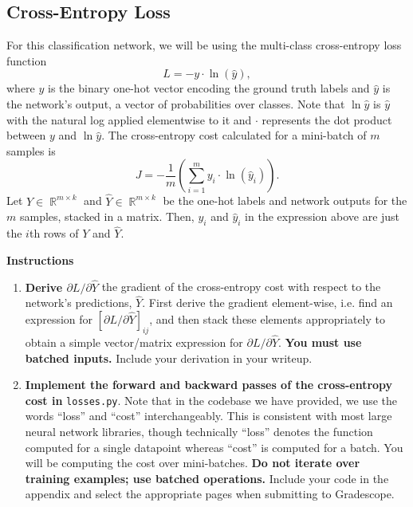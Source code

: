 \documentclass{article}
\DeclareMathOperator{\R}{\mathbb{R}}
\begin{document}
\subsection{Cross-Entropy Loss}
For this classification network, we will be using the multi-class cross-entropy loss function
\[
    L = -y \cdot \ln{(\hat{y})},
\]
where $y$ is the binary one-hot vector encoding the ground truth labels and $\hat{y}$ is the network's output, a vector of probabilities over classes. 
Note that $\ln\hat{y}$ is $\hat{y}$ with the natural log applied elementwise to it and $\cdot$ represents the dot product between $y$ and $\ln\hat{y}$. 
The cross-entropy cost calculated for a mini-batch of $m$ samples is
\[
    J = -\frac{1}{m}\left(\sum_{i=1}^m y_i \cdot \ln{(\hat{y}_i)}\right).
\]
Let $Y \in \R^{m \times k}$ and $\hat{Y} \in \R^{m \times k}$ be the one-hot labels and network outputs for the $m$ samples, stacked in a matrix. 
Then, $y_i$ and $\hat{y}_i$ in the expression above are just the $i$th rows of $Y$ and $\hat{Y}$.

\textbf{Instructions}
\begin{enumerate}
    \item 
    \textbf{Derive $\partial L/\partial \hat{Y}$} the gradient of the cross-entropy cost with respect to the network's predictions, $\hat{Y}$. 
    First derive the gradient element-wise, i.e. find an expression for $[\partial L/\partial \hat{Y}]_{ij}$, and then stack these elements appropriately to obtain a simple vector/matrix expression for $\partial L/\partial \hat{Y}$. 
    \textbf{You must use batched inputs.} Include your derivation in your writeup.
    
    \item 
    \textbf{Implement the forward and backward passes of the cross-entropy cost in} \texttt{losses.py}. 
    Note that in the codebase we have provided, we use the words ``loss'' and ``cost'' interchangeably. 
    This is consistent with most large neural network libraries, though technically ``loss'' denotes the function computed for a single datapoint whereas ``cost'' is computed for a batch. 
    You will be computing the cost over mini-batches. 
    \textbf{Do not iterate over training examples; use batched operations.} 
    Include your code in the appendix and select the appropriate pages when submitting to Gradescope.
\end{enumerate}
\end{document}
